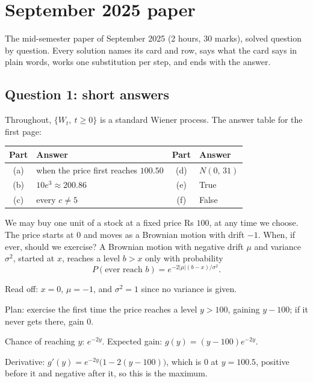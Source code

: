 \chapter{September 2025 paper}
\label{ch:paper-2025-sep}

\begin{whatfor}
The mid-semester paper of September 2025 (2 hours, 30 marks), solved question by question. Every solution names its card and row, says what the card says in plain words, works one substitution per step, and ends with the answer.
\end{whatfor}

\section{Question 1: short answers}

Throughout, $\{W_t,\ t\ge0\}$ is a standard Wiener process. The answer table for the first page:

\begin{center}
\begin{tabular}{@{}cl@{\qquad}cl@{}}
\toprule
Part & Answer & Part & Answer\\
\midrule
(a) & when the price first reaches $100.50$ & (d) & $N(0,\,31)$\\
(b) & $10e^3\approx200.86$ & (e) & True\\
(c) & every $c\ne5$ & (f) & False\\
\bottomrule
\end{tabular}
\end{center}

\begin{problem}[Q1(a)]
We may buy one unit of a stock at a fixed price Rs $100$, at any time we choose. The price starts at $0$ and moves as a Brownian motion with drift $-1$. When, if ever, should we exercise?
\cardsays A Brownian motion with negative drift $\mu$ and variance $\sigma^2$, started at $x$, reaches a level $b>x$ only with probability
\[
P(\text{ever reach }b)=e^{-2|\mu|(b-x)/\sigma^2}.
\]
\working
\begin{steps}
\item Read off: $x=0$, $\mu=-1$, and $\sigma^2=1$ since no variance is given.
\item Plan: exercise the first time the price reaches a level $y>100$, gaining $y-100$; if it never gets there, gain $0$.
\item Chance of reaching $y$: $e^{-2y}$. Expected gain: $g(y)=(y-100)e^{-2y}$.
\item Derivative: $g'(y)=e^{-2y}\big(1-2(y-100)\big)$, which is $0$ at $y=100.5$, positive before it and negative after it, so this is the maximum.
\end{steps}
\end{problem}

